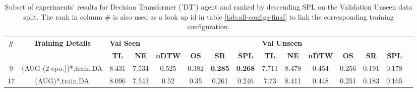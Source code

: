 \begin{table}
\centering
\caption{\label{tab:dt_dagger_envdrop}Subset of experiments' results for Decision Transformer ('DT') agent and ranked by descending SPL on the Validation Unseen data split. The rank in column \# is also used as a look up id in table \ref{tab:all-configs-final} to link the corresponding training configuration.}
\begin{tabular}{@{\hskip3pt}c@{\hskip3pt}c@{\hskip3pt}c@{\hskip3pt}c@{\hskip3pt}c@{\hskip3pt}c@{\hskip3pt}c@{\hskip3pt}c@{\hskip3pt}c@{\hskip3pt}c@{\hskip3pt}c@{\hskip3pt}c@{\hskip3pt}c@{\hskip3pt}c@{\hskip3pt}c}
\toprule
\textbf{\#} & \textbf{Training Details} & \multicolumn{6}{l}{\textbf{Val Seen}} & \multicolumn{6}{l}{\textbf{Val Unseen}} \\
 \textbf{~} &                \textbf{~} &       \textbf{TL} & \textbf{NE} & \textbf{nDTW} & \textbf{OS} &     \textbf{SR} &    \textbf{SPL} &         \textbf{TL} & \textbf{NE} & \textbf{nDTW} & \textbf{OS} & \textbf{SR} & \textbf{SPL} \\
\midrule
          9 &  (AUG (2 epo.))*,train,DA &             8.431 &       7.534 &         0.525 &       0.382 &  \textbf{0.285} &  \textbf{0.268} &               7.711 &       8.478 &         0.454 &       0.256 &       0.191 &        0.178 \\
         17 &           (AUG)*,train,DA &             8.096 &       7.543 &          0.52 &        0.35 &           0.261 &           0.246 &                7.73 &       8.411 &         0.448 &       0.251 &       0.183 &        0.165 \\
\bottomrule
\end{tabular}
\end{table}

